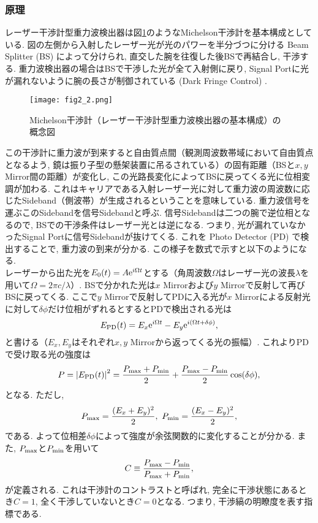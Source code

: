 \subsubsection{原理}
\vskip3mm
レーザー干渉計型重力波検出器は図\ref{fig2.2}のようなMichelson干渉計を基本構成としている. 図の左側から入射したレーザー光が光のパワーを半分づつに分ける Beam Splitter (BS) によって分けられ, 直交した腕を往復した後BSで再結合し, 干渉する. 重力波検出器の場合はBSで干渉した光が全て入射側に戻り, Signal Portに光が漏れないように腕の長さが制御されている (Dark Fringe Control) . 
\begin{figure}[H]
\begin{center}
\texttt{[image: fig2\_2.png]}
\caption[Michelson干渉計]{Michelson干渉計（レーザー干渉計型重力波検出器の基本構成）の概念図}
\label{fig2.2}
\end{center}
\end{figure}
この干渉計に重力波が到来すると自由質点間（観測周波数帯域において自由質点となるよう, 鏡は振り子型の懸架装置に吊るされている）の固有距離（BSと$x,y$ Mirror間の距離）が変化し, この光路長変化によってBSに戻ってくる光に位相変調が加わる. これはキャリアである入射レーザー光に対して重力波の周波数に応じたSideband（側波帯）が生成されるということを意味している. 重力波信号を運ぶこのSidebandを信号Sidebandと呼ぶ. 信号Sidebandは二つの腕で逆位相となるので, BSでの干渉条件はレーザー光とは逆になる. つまり, 光が漏れていなかったSignal Portに信号Sidebandが抜けてくる. これを Photo Detector (PD) で検出することで, 重力波の到来が分かる. この様子を数式で示すと以下のようになる. \\
\quad レーザーから出た光を$E_0(t)=A{\rm e}^{i\Omega t}$とする（角周波数$\Omega$はレーザー光の波長$\lambda$を用いて$\Omega=2\pi c/\lambda$）. BSで分かれた光は$x$ Mirrorおよび$y$ Mirrorで反射して再びBSに戻ってくる. ここで$y$ Mirrorで反射してPDに入る光が$x$ Mirrorによる反射光に対して$\delta\phi$だけ位相がずれるとするとPDで検出される光は
\begin{equation}
E_{\rm PD}(t)=E_x{\rm e}^{i\Omega t}-E_y{\rm e}^{i(\Omega t+\delta\phi)},
\end{equation}
と書ける（$E_x,E_y$はそれぞれ$x,y$ Mirrorから返ってくる光の振幅）. これよりPDで受け取る光の強度は
\begin{equation}
P=\left|E_{\rm PD}(t)\right|^2=\frac{P_{\rm max}+P_{\rm min}}{2}+\frac{P_{\rm max}-P_{\rm min}}{2}\cos(\delta\phi),
\end{equation}
となる. ただし, 
\begin{equation}
P_{\rm max}=\frac{(E_x+E_y)^2}{2},\,\,P_{\rm min}=\frac{(E_x-E_y)^2}{2},
\end{equation}
である. よって位相差$\delta\phi$によって強度が余弦関数的に変化することが分かる. また, $P_{\rm max}$と$P_{\rm min}$を用いて
\begin{equation}
C\equiv\frac{P_{\rm max}-P_{\rm min}}{P_{\rm max}+P_{\rm min}},
\end{equation}
が定義される. これは干渉計のコントラストと呼ばれ, 完全に干渉状態にあるとき$C=1$, 全く干渉していないとき$C=0$となる. つまり, 干渉縞の明瞭度を表す指標である. 
